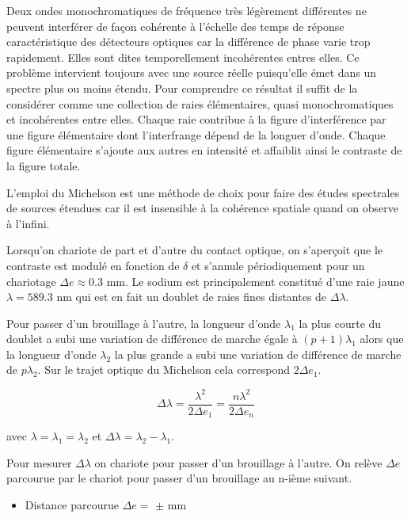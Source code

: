 \documentclass[french]{article}
\begin{document}
Deux ondes monochromatiques de fréquence très légèrement différentes ne peuvent interférer de façon cohérente à l'échelle des temps de réponse caractéristique des détecteurs optiques car la différence de phase varie trop rapidement. Elles sont dites temporellement incohérentes entres elles. Ce problème intervient toujours avec une source réelle puisqu'elle émet dans un spectre plus ou moins étendu. Pour comprendre ce résultat il suffit de la considérer comme une collection de raies élémentaires, quasi monochromatiques et incohérentes entre elles. Chaque raie contribue à la figure d'interférence par une figure élémentaire dont l'interfrange dépend de la longuer d'onde. Chaque figure élémentaire s'ajoute aux autres en intensité et affaiblit ainsi le contraste de la figure totale.\vspace{.15cm}

L'emploi du Michelson est une méthode de choix pour faire des études spectrales de sources étendues car il est insensible à la cohérence spatiale quand on observe à l'infini.
\vspace{.15cm}

Lorsqu'on chariote de part et d'autre du contact optique, on s'aperçoit que le contraste est modulé en fonction de $\delta$ et s'annule périodiquement pour un chariotage $\Delta e \approx 0.3$ mm. Le sodium est principalement constitué d'une raie jaune $\lambda = 589.3$ nm qui est en fait un doublet de raies fines distantes de $\Delta \lambda$.

Pour passer d’un brouillage à l’autre, la longueur d’onde $\lambda_1$ la plus courte du doublet a subi une variation de différence de marche égale à $\left(p+1\right)\lambda_1$ alors que la longueur d’onde $\lambda_2$ la plus grande a subi une variation de différence de marche de $p\lambda_2$. Sur le trajet optique du Michelson cela correspond $2\Delta e_1$.

\[\Delta \lambda = \frac{\lambda^2}{2\Delta e_1} = \frac{n\lambda ^2}{2\Delta e_n}\]

\noindent avec $\lambda = \lambda_1 = \lambda_2$ et $\Delta\lambda  = \lambda_2 - \lambda_1$.

Pour mesurer $\Delta \lambda$ on chariote pour passer d'un brouillage à l'autre. On relève $\Delta e$ parcourue par le chariot pour passer d'un brouillage au n-ième suivant. 

\begin{remarque}
	\begin{itemize}
		\item Distance parcourue $\Delta e = $  $\pm$  mm
	\end{itemize}
\end{remarque}
\end{document}
